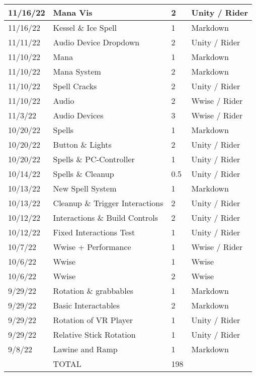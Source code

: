 \begin{longtable}{|p{1.5cm}|p{6cm}|p{1.2cm}|p{2.7cm}|}
	11/16/22 & Mana Vis & 2 & Unity / Rider \\ \hline
	11/16/22 & Kessel \& Ice Spell & 1 & Markdown \\ \hline
	11/11/22 & Audio Device Dropdown & 2 & Unity / Rider \\ \hline
	11/10/22 & Mana & 1 & Markdown \\ \hline
	11/10/22 & Mana System & 2 & Markdown \\ \hline
	11/10/22 & Spell Cracks & 2 & Unity / Rider \\ \hline
	11/10/22 & Audio & 2 & Wwise / Rider \\ \hline
	11/3/22 & Audio Devices & 3 & Wwise / Rider \\ \hline
	10/20/22 & Spells & 1 & Markdown \\ \hline
	10/20/22 & Button \& Lights & 2 & Unity / Rider \\ \hline
	10/20/22 & Spells \& PC-Controller & 1 & Unity / Rider \\ \hline
	10/14/22 & Spells \& Cleanup & 0.5 & Unity / Rider \\ \hline
	10/13/22 & New Spell System & 1 & Markdown \\ \hline
	10/13/22 & Cleanup \& Trigger Interactions & 2 & Unity / Rider \\ \hline
	10/12/22 & Interactions \& Build Controls & 2 & Unity / Rider \\ \hline
	10/12/22 & Fixed Interactions Test & 1 & Unity / Rider \\ \hline
	10/7/22 & Wwise + Performance & 1 & Wwise / Rider \\ \hline
	10/6/22 & Wwise & 1 & Wwise \\ \hline
	10/6/22 & Wwise & 2 & Wwise \\ \hline
	9/29/22 & Rotation \& grabbables & 1 & Markdown \\ \hline
	9/29/22 & Basic Interactables & 2 & Markdown \\ \hline
	9/29/22 & Rotation of VR Player & 1 & Unity / Rider \\ \hline
	9/29/22 & Relative Stick Rotation & 1 & Unity / Rider \\ \hline
	9/8/22 & Lawine and Ramp & 1 & Markdown \\ \hline
	~ & TOTAL & 198 & ~ \\ \hline
\end{longtable}